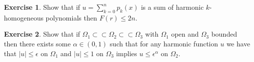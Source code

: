 \documentclass[a4paper,11pt]{article}
\theoremstyle{definition}
\newtheorem{exercise}{Exercise}
\begin{document}
\begin{exercise}
	Show that if $u = \sum_{k=0}^n p_k(x)$ is a sum of harmonic $k$-homogeneous polynomials then $F(r) \leq 2n$.
\end{exercise}

\begin{exercise}
	Show that if $\Omega_1 \subset\subset \Omega_2 \subset\subset \Omega_3$ with $\Omega_1$ open and $\Omega_3$ bounded then there exists some $\alpha \in (0,1)$ such that for any harmonic function $u$ we have that $|u| \leq \epsilon$ on $\Omega_1$ and $|u| \leq 1$ on $\Omega_3$ implies $u \leq \epsilon^\alpha$ on $\Omega_2$.
\end{exercise}
\end{document}
